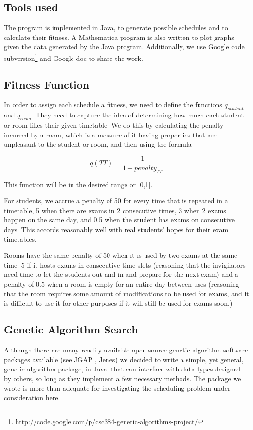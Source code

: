 \documentclass[letterpaper]{article}
\begin{document}
  \subsection{Tools used}
    The program is implemented in Java, to generate possible schedules and to calculate
    their fitness. A Mathematica program is also written to plot graphs, given the data
    generated by the Java program. Additionally, we use Google code 
    subversion\footnote{\url{http://code.google.com/p/csc384-genetic-algorithms-project/}}
    and Google doc to share the work.
    
  \subsection{Fitness Function}
    In order to assign each schedule a fitness, we need to define the functions 
    $q_{student}$ and $q_{room}$. They need to capture the idea of determining how
    much each student or room likes their given timetable. We do this by calculating 
    the penalty incurred by a room, which is a measure of it having properties that 
    are unpleasant to the student or room, and then using the formula
    
    \[ q(TT)=\frac{1}{1+penalty_{TT}} \]
    
    This function will be in the desired range or [0,1].
    
    For students, we accrue a penalty of 50 for every time that is repeated in a 
    timetable, 5 when there are exams in 2 consecutive times, 3 when 2 exams happen 
    on the same day, and 0.5 when the student has exams on consecutive days. This 
    accords reasonably well with real students' hopes for their exam timetables.
    
    Rooms have the same penalty of 50 when it is used by two exams at the same time, 
    5 if it hosts exams in consecutive time slots (reasoning that the invigilators 
    need time to let the students out and in and prepare for the next exam) and a 
    penalty of 0.5 when a room is empty for an entire day between uses (reasoning 
    that the room requires some amount of modifications to be used for exams, and 
    it is difficult to use it for other purposes if it will still be used for exams 
    soon.)
    
  \subsection{Genetic Algorithm Search}
    Although there are many readily available open source genetic algorithm software
    packages available (see JGAP \cite{website:JGAP}, Jenes\cite{website:jenes}) we 
    decided to write a simple, yet general, genetic algorithm package, in Java, that
    can interface with data types designed by others, so long as they implement a few
    necessary methods. The package we wrote is more than adequate for investigating
    the scheduling problem under consideration here.
    
\end{document}
